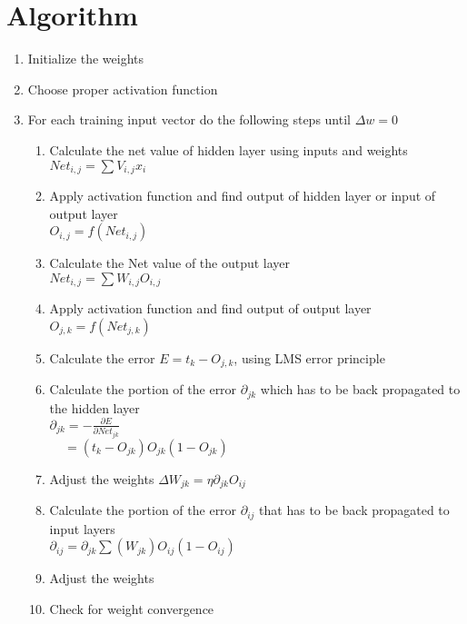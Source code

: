 \documentclass[12pt, right open]{memoir}
\begin{document}
\section{Algorithm}
\begin{enumerate}
\item Initialize the weights
\item Choose proper activation function
\item For each training input vector do the following steps until $\Delta w = 0$
\begin{enumerate}
\item Calculate the net value of hidden layer using inputs and weights \\
$ Net_{i,j} = \sum V_{i,j}x_i $
\item Apply activation function and find output of hidden layer or input of output layer \\
$ O_{i,j} = f(Net_{i,j}) $
\item Calculate the Net value of the output layer \\
$ Net_{i,j} = \sum W_{i,j} O_{i,j} $
\item Apply activation function and find output of output layer \\
$ O_{j,k} = f(Net_{j,k}) $ 
\item Calculate the error $E = t_k - O_{j,k} $, using LMS error principle
\item Calculate the portion of the error $ \partial_{jk} $ which has to be back propagated to the hidden layer \\
$ \partial_{jk} = - \frac{\partial E}{\partial Net_{jk}} $ \\
$          ~~~~~= (t_k - O_{jk}) O_{jk}(1-O_{jk}) $
\item Adjust the weights $\Delta W_{jk} = \eta \partial_{jk} O_{ij} $
\item Calculate the portion of the error $ \partial_{ij} $ that has to be back propagated to input layers \\
$ \partial_{ij} = \partial_{jk} \sum (W_{jk})O_{ij}(1-O_{ij}) $
\item Adjust the weights 
\item Check for weight convergence
\end{enumerate}
\end{enumerate}
\end{document}
